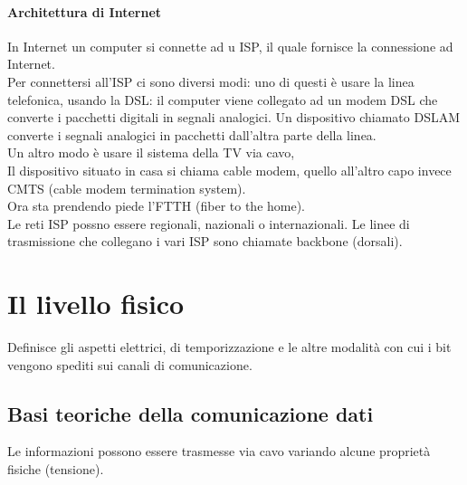\documentclass{article}
\begin{document}
		\paragraph{Architettura di Internet} In Internet un computer si connette ad u ISP, il quale fornisce la connessione ad Internet. \\
		Per connettersi all'ISP ci sono diversi modi: uno di questi è usare la linea telefonica, usando la DSL: il computer viene collegato ad un modem DSL che converte i pacchetti digitali in segnali analogici. Un dispositivo chiamato DSLAM converte i segnali analogici in pacchetti dall'altra parte della linea.\\
		Un altro modo è usare il sistema della TV via cavo, \\ Il dispositivo situato in casa si chiama cable modem, quello all'altro capo invece CMTS (cable modem termination system). \\
		Ora sta prendendo piede l'FTTH (fiber to the home).\\
		Le reti ISP possno essere regionali, nazionali o internazionali. Le linee di trasmissione che collegano i vari ISP sono chiamate backbone (dorsali). 
		\newpage
		\section{Il livello fisico}
		Definisce gli aspetti elettrici, di temporizzazione e le altre modalità con cui i bit vengono spediti sui canali di comunicazione.\\
		\subsection{Basi teoriche della comunicazione dati}
		Le informazioni possono essere trasmesse via cavo variando alcune proprietà fisiche (tensione).
\end{document}
